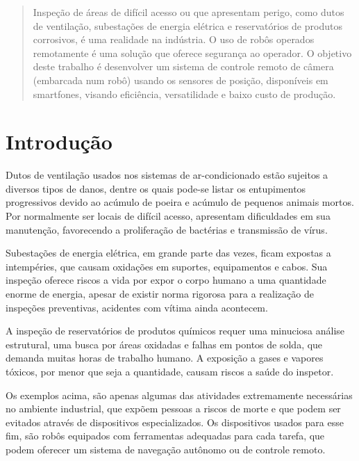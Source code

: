 \documentclass[12pt,a4paper]{article}
\begin{document}
\pagebreak



\tableofcontents
\newpage


\begin{abstract}
	Inspeção de áreas de difícil acesso ou que apresentam perigo, como dutos de ventilação, subestações de energia elétrica e reservatórios de produtos corrosivos, é uma realidade na indústria. O uso de robôs operados remotamente é uma solução que oferece segurança ao operador. O objetivo deste trabalho é desenvolver um sistema de controle remoto de câmera (embarcada num robô) usando os sensores de posição, disponíveis em smartfones, visando eficiência, versatilidade e baixo custo de produção.
\end{abstract}


\section{Introdução}
	Dutos de ventilação usados nos sistemas de ar-condicionado estão sujeitos a diversos tipos de danos, dentre os quais pode-se listar os entupimentos progressivos devido ao acúmulo de poeira e acúmulo de pequenos animais mortos. Por normalmente ser locais de difícil acesso, apresentam dificuldades em sua manutenção, favorecendo a proliferação de bactérias e transmissão de vírus\cite{carmo1999qualidade}\cite{bortoletto2002contaminaccao}.\par
	Subestações de energia elétrica, em grande parte das vezes, ficam expostas a intempéries, que causam oxidações em suportes, equipamentos e cabos. Sua inspeção oferece riscos a vida por expor o corpo humano a uma quantidade enorme de energia, apesar de existir norma rigorosa para a realização de inspeções preventivas, acidentes com vítima ainda acontecem\cite{santos2012inspeccao}.\par
	A inspeção de reservatórios de produtos químicos requer uma minuciosa análise estrutural, uma busca por áreas oxidadas e falhas em pontos de solda, que demanda muitas horas de trabalho humano. A exposição a gases e vapores tóxicos, por menor que seja a quantidade, causam riscos a saúde do inspetor\cite{souza2012inspeccao}\cite{molina2008metodo}.\par
	Os exemplos acima, são apenas algumas das atividades extremamente necessárias no ambiente industrial, que expõem pessoas a riscos de morte e que podem ser evitados através de dispositivos especializados. Os dispositivos usados para esse fim, são robôs equipados com ferramentas adequadas para cada tarefa, que podem oferecer um sistema de navegação autônomo ou de controle remoto.
\end{document}
